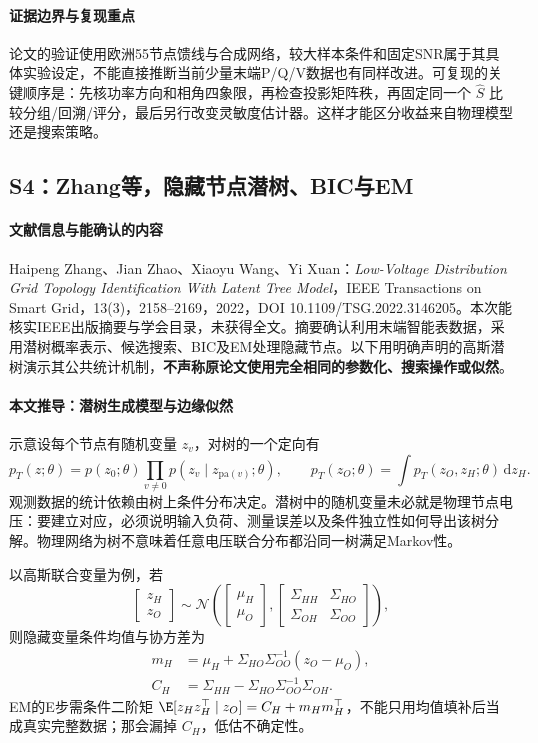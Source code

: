 \paragraph{证据边界与复现重点}
论文的验证使用欧洲55节点馈线与合成网络，较大样本条件和固定SNR属于其具体实验设定，不能直接推断当前少量末端P/Q/V数据也有同样改进。可复现的关键顺序是：先核功率方向和相角四象限，再检查投影矩阵秩，再固定同一个 $\widehat S$ 比较分组/回溯/评分，最后另行改变灵敏度估计器。这样才能区分收益来自物理模型还是搜索策略。

\subsection{S4：Zhang等，隐藏节点潜树、BIC与EM}
\paragraph{文献信息与能确认的内容}
Haipeng Zhang、Jian Zhao、Xiaoyu Wang、Yi Xuan：\emph{Low-Voltage Distribution Grid Topology Identification With Latent Tree Model}，IEEE Transactions on Smart Grid，13(3)，2158--2169，2022，DOI 10.1109/TSG.2022.3146205\citep{S4}。本次能核实IEEE出版摘要与学会目录，未获得全文。摘要确认利用末端智能表数据，采用潜树概率表示、候选搜索、BIC及EM处理隐藏节点。以下用明确声明的高斯潜树演示其公共统计机制，\textbf{不声称原论文使用完全相同的参数化、搜索操作或似然}。

\paragraph{本文推导：潜树生成模型与边缘似然}
示意设每个节点有随机变量 $z_v$，对树的一个定向有
\begin{equation}
 p_T(z;\theta)=p(z_0;\theta)\prod_{v\ne0}p(z_v\mid z_{\mathrm{pa}(v)};\theta),
 \qquad p_T(z_O;\theta)=\int p_T(z_O,z_H;\theta)\,\mathrm dz_H.
\end{equation}
观测数据的统计依赖由树上条件分布决定。潜树中的随机变量未必就是物理节点电压：要建立对应，必须说明输入负荷、测量误差以及条件独立性如何导出该树分解。物理网络为树不意味着任意电压联合分布都沿同一树满足Markov性。

以高斯联合变量为例，若
\begin{equation}
 \begin{bmatrix}z_H\\z_O\end{bmatrix}\sim
 \mathcal N\left(\begin{bmatrix}\mu_H\\\mu_O\end{bmatrix},
 \begin{bmatrix}\Sigma_{HH}&\Sigma_{HO}\\\Sigma_{OH}&\Sigma_{OO}\end{bmatrix}\right),
\end{equation}
则隐藏变量条件均值与协方差为
\begin{align}
 m_H&=\mu_H+\Sigma_{HO}\Sigma_{OO}^{-1}(z_O-\mu_O),\\
 C_H&=\Sigma_{HH}-\Sigma_{HO}\Sigma_{OO}^{-1}\Sigma_{OH}.
\end{align}
EM的E步需条件二阶矩 $\E[z_Hz_H^\top\mid z_O]=C_H+m_Hm_H^\top$，不能只用均值填补后当成真实完整数据；那会漏掉 $C_H$，低估不确定性。


